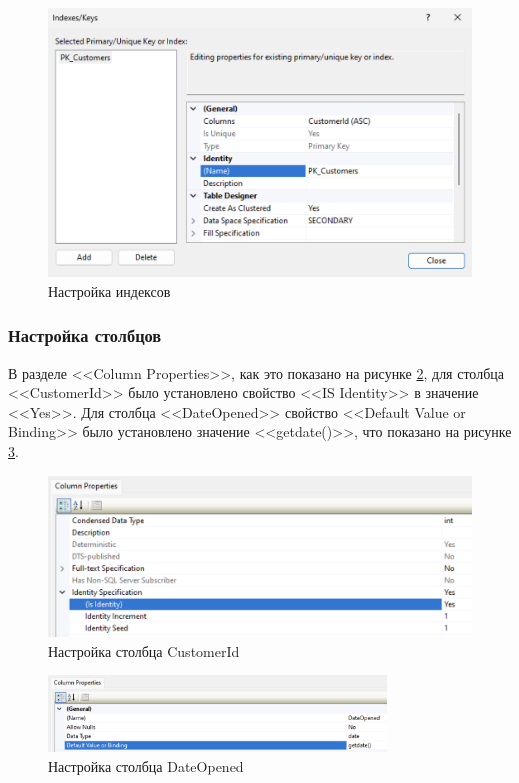\documentclass[a4paper, 14pt]{extarticle}
\begin{document}
\begin{figure}[H]
  \centering
  \includegraphics[width=\textwidth]{images/task-1/5.png}
  \caption{Настройка индексов}
  \label{fig:task-1-5}
\end{figure}

\subsubsection{Настройка столбцов}

В разделе <<Column Properties>>, как это показано на рисунке
\ref{fig:task-1-6}, для столбца <<CustomerId>> было установлено свойство <<IS
Identity>> в значение <<Yes>>. Для столбца <<DateOpened>> свойство <<Default
Value or Binding>> было установлено значение <<getdate()>>, что показано на
рисунке \ref{fig:task-1-7}.

\begin{figure}[H]
  \centering
  \includegraphics[width=\textwidth]{images/task-1/6.png}
  \caption{Настройка столбца CustomerId}
  \label{fig:task-1-6}
\end{figure}

\begin{figure}[H]
  \centering
  \includegraphics[width=0.8\textwidth]{images/task-1/7.png}
  \caption{Настройка столбца DateOpened}
  \label{fig:task-1-7}
\end{figure}
\end{document}
